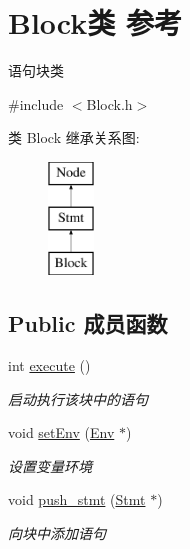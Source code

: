\hypertarget{class_block}{}\section{Block类 参考}
\label{class_block}


语句块类  




{\ttfamily \#include $<$Block.\+h$>$}

类 Block 继承关系图\+:\begin{figure}[H]
\begin{center}
\leavevmode
\includegraphics[height=3.000000cm]{class_block}
\end{center}
\end{figure}
\subsection*{Public 成员函数}
\begin{DoxyCompactItemize}
\item 
int \hyperlink{class_block_a8e03f15df4e43cd6c802341c3bda6b33}{execute} ()\hypertarget{class_block_a8e03f15df4e43cd6c802341c3bda6b33}{}\label{class_block_a8e03f15df4e43cd6c802341c3bda6b33}

\begin{DoxyCompactList}\small\item\em 启动执行该块中的语句 \end{DoxyCompactList}\item 
void \hyperlink{class_block_aa48058bd426766898bf31df828b3dac2}{set\+Env} (\hyperlink{class_env}{Env} $\ast$)\hypertarget{class_block_aa48058bd426766898bf31df828b3dac2}{}\label{class_block_aa48058bd426766898bf31df828b3dac2}

\begin{DoxyCompactList}\small\item\em 设置变量环境 \end{DoxyCompactList}\item 
void \hyperlink{class_block_acd012454c035cc7e0d508365752221ff}{push\+\_\+stmt} (\hyperlink{class_stmt}{Stmt} $\ast$)\hypertarget{class_block_acd012454c035cc7e0d508365752221ff}{}\label{class_block_acd012454c035cc7e0d508365752221ff}

\begin{DoxyCompactList}\small\item\em 向块中添加语句 \end{DoxyCompactList}\end{DoxyCompactItemize}
